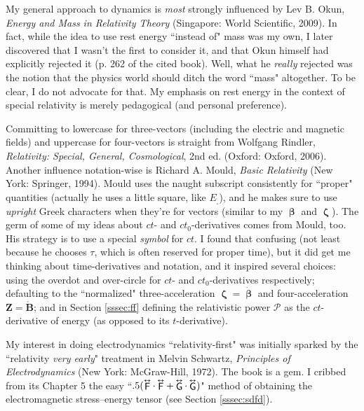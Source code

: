 \documentclass[12pt]{article}
\renewcommand{\vv}[1]{\mathbf{#1}}
\newcommand{\vvbeta}{\bm{\upbeta}}
\newcommand{\vvzeta}{\bm{\upzeta}}
\newcommand{\tightoverset}[2]{%
  \mathop{#2}\limits^{\vbox to -.5ex{\kern-0.75ex\hbox{$#1$}\vss}}}
\newcommand{\inlinedy}[1]{\tightoverset{\text{\tiny$\bm\leftrightarrow$}}{#1}}
\begin{document}
My general approach to dynamics is \emph{most} strongly influenced by Lev B. Okun, \emph{Energy and Mass in Relativity Theory} (Singapore: World Scientific, 2009). In fact, while the idea to use rest energy ``instead of" mass was my own, I later discovered that I wasn't the first to consider it, and that Okun himself had explicitly rejected it (p. 262 of the cited book). Well, what he \emph{really} rejected was the notion that the physics world should ditch the word ``mass" altogether. To be clear, I do not advocate for that. My emphasis on rest energy in the context of special relativity is merely pedagogical (and personal preference).

Committing to lowercase for three-vectors (including the electric and magnetic fields) and uppercase for four-vectors is straight from Wolfgang Rindler, \emph{Relativity: Special, General, Cosmological}, 2nd ed. (Oxford: Oxford, 2006). Another influence notation-wise is Richard A. Mould, \emph{Basic Relativity} (New York: Springer, 1994). Mould uses the naught subscript consistently for ``proper" quantities (actually he uses a little square, like $E_{{}_\square}$), and he makes sure to use \emph{upright} Greek characters when they're for vectors (similar to my $\vvbeta$ and $\vvzeta$). The germ of some of my ideas about $ct$- and $ct_0$-derivatives comes from Mould, too. His strategy is to use a special \emph{symbol} for $ct$. I found that confusing (not least because he chooses $\tau$, which is often reserved for proper time), but it did get me thinking about time-derivatives and notation, and it inspired several choices: using the overdot and over-circle for $ct$- and $ct_0$-derivatives respectively; defaulting to the ``normalized" three-acceleration $\vvzeta = \dot{\vvbeta}$ and four-acceleration $\vv Z = \mathring{\vv B}$; and in Section \ref{sssec:ff} defining the relativistic power $\mathcal{P}$ as the $ct$-derivative of energy (as opposed to its $t$-derivative).

My interest in doing electrodynamics ``relativity-first" was initially sparked by the ``relativity \emph{very early}" treatment in Melvin Schwartz, \emph{Principles of Electrodynamics} (New York: McGraw-Hill, 1972). The book is a gem. I cribbed from its Chapter 5 the easy ``$.5 ( \inlinedy{\mathsf{F}} \cdot \inlinedy{\mathsf{F}} + \inlinedy{\mathsf{G}} \cdot \inlinedy{\mathsf{G}} )$" method of obtaining the electromagnetic stress--energy tensor (see Section \ref{sssec:sdfd}).
\end{document}
